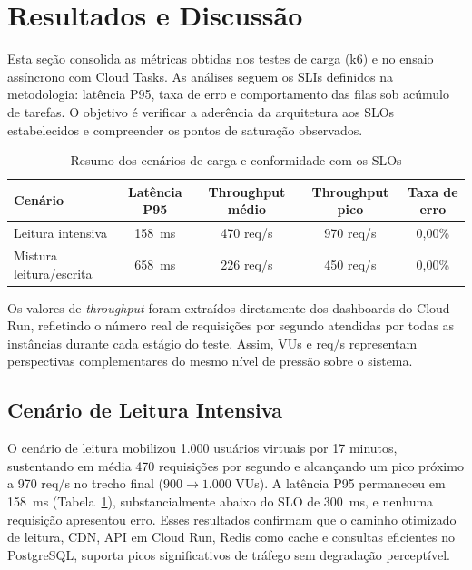 \section{Resultados e Discussão}
\label{sec:resultados}

Esta seção consolida as métricas obtidas nos testes de carga (k6) e no ensaio
assíncrono com Cloud Tasks. As análises seguem os SLIs definidos na metodologia:
latência P95, taxa de erro e comportamento das filas sob acúmulo de tarefas. O
objetivo é verificar a aderência da arquitetura aos SLOs estabelecidos e
compreender os pontos de saturação observados.

\begin{table}[ht]
    \centering
    \caption{Resumo dos cenários de carga e conformidade com os SLOs}
    \label{tab:resultados_k6}
    \begin{tabular}{lcccc}
        \toprule
Cenário & Latência P95 & Throughput médio & Throughput pico & Taxa de erro \\
        \midrule
Leitura intensiva & 158~ms & 470 req/s & 970 req/s & 0{,}00\% \\ Mistura
leitura/escrita & 658~ms & 226 req/s & 450 req/s & 0{,}00\% \\
        \bottomrule
    \end{tabular}
\end{table}

Os valores de \textit{throughput} foram extraídos diretamente dos dashboards do
Cloud Run, refletindo o número real de requisições por segundo atendidas por
todas as instâncias durante cada estágio do teste. Assim, VUs e req/s
representam perspectivas complementares do mesmo nível de pressão sobre o
sistema.

\subsection{Cenário de Leitura Intensiva}

O cenário de leitura mobilizou 1.000 usuários virtuais por 17 minutos,
sustentando em média 470 requisições por segundo e alcançando um pico próximo a
970 req/s no trecho final ($900\rightarrow 1.000$ VUs). A latência P95
permaneceu em 158~ms (Tabela~\ref{tab:resultados_k6}), substancialmente abaixo
do SLO de 300~ms, e nenhuma requisição apresentou erro. Esses resultados
confirmam que o caminho otimizado de leitura, CDN, API em Cloud Run, Redis como
cache e consultas eficientes no PostgreSQL, suporta picos significativos de
tráfego sem degradação perceptível.

